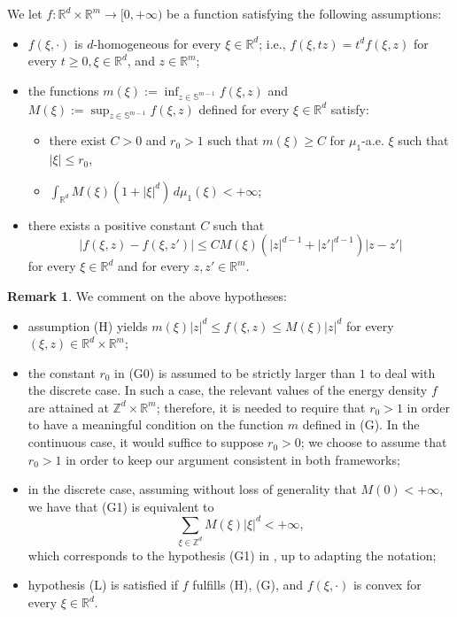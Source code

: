 \documentclass{article}
\theoremstyle{plain}
\theoremstyle{definition}
\newtheorem{remark}[theorem]{Remark}
\def\rr{{\mathbb R}}
\def\ZZ{{\mathbb Z}}
\numberwithin{equation}{section}
\begin{document}
\smallskip

We let $f:\mathbb{R}^{d}\times \mathbb{R}^{m}\rightarrow[0,+\infty)$ be a function satisfying the following assumptions:
\begin{itemize}
    \item[(H)]$f(\xi, \cdot)$ is $d$-homogeneous for every $\xi\in\mathbb{R}^d$; i.e., $f(\xi,tz)=t^df(\xi,z)$ for every $t\geq 0, \xi \in \mathbb{R}^{d}$, and $z\in \mathbb{R}^{m}$; 
    \item[(G)]
    the functions $m(\xi):=\displaystyle\inf_{z \in \mathbb{S}^{m-1}} f(\xi,z)$ and $M(\xi):=\displaystyle \sup_{z \in \mathbb{S}^{m-1}} f(\xi,z)$ defined for every $\xi\in \rr^d$ satisfy: 
    \begin{itemize}
        \item[(G0)] there exist $C>0$ and $r_0>1$ such that $m(\xi)\geq  C$ for $\mu_1$-a.e. $\xi$ such that $|\xi|\leq r_0$,
        \item[(G1)] $\displaystyle\int_{\mathbb{R}^d}M(\xi)(1+|\xi|^d)\, d\mu_1(\xi)<+\infty$;
    \end{itemize}    
    \item[(L)] there exists a positive constant $C$ such that 
    \begin{equation*}
        |f(\xi,z)-f(\xi,z')|\leq CM(\xi)(|z|^{d-1}+|z'|^{d-1})|z-z'|
    \end{equation*}
    for every $\xi \in \mathbb{R}^{d}$ and for every $z, z' \in \mathbb{R}^{m}$.
\end{itemize}



\begin{remark}
\label{rmk: bound uniforme} We comment on the above hypotheses:
\begin{itemize}
    \item[(i)] assumption (H) yields $m(\xi)|z|^d\leq f(\xi,z)\leq M(\xi)|z|^d$ for every $(\xi,z)\in \mathbb{R}^d\times \mathbb{R}^m$;
    \item[(ii)] the constant $r_0$ in (G0) is assumed to be strictly larger than $1$ to deal with the discrete case. In such a case, the relevant values of the energy density $f$ are attained at $\ZZ^d\times \rr^m$; therefore, it is needed to require that $r_0>1$ in order to have a meaningful condition on the function $m$ defined in (G). In the continuous case, it would suffice to suppose $r_0>0$; we choose to assume that $r_0>1$ in order to keep our argument consistent in both frameworks;  
    \item[(iii)] in the discrete case, assuming without loss of generality that $M(0)<+\infty$, we have that (G1) is equivalent to
    \begin{equation*}
    \sum_{\xi\in\ZZ^d}M(\xi)|\xi|^d<+\infty,
    \end{equation*}
    which corresponds to the hypothesis (G1) in \cite{Fus}, up to adapting the notation;
    \item[(iv)] hypothesis (L) is satisfied if $f$ fulfills (H), (G), and $f(\xi,\cdot)$ is convex for every $\xi \in \mathbb{R}^{d}$. 
\end{itemize}
    
\end{remark}
\end{document}
